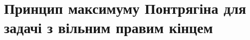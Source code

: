 




\setcounter{section}{6}
\section{Принцип максимуму Понтрягіна для задачі з вільним правим кінцем}








